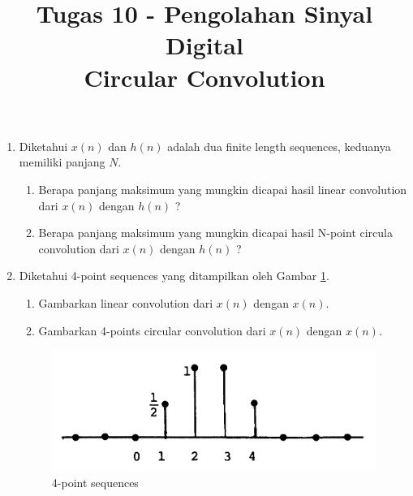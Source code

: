 \documentclass[12pt,a4paper]{article}
\title{Tugas 10 - Pengolahan Sinyal Digital\\
		Circular Convolution}
\date{}
\begin{document}
	\maketitle
	\date{}
	\begin{enumerate}
		\item Diketahui $ x(n) $ dan $ h(n) $ adalah dua finite length sequences, keduanya memiliki panjang $ N $.
		\begin{enumerate}
			\item Berapa panjang maksimum yang mungkin dicapai hasil linear convolution dari $ x(n) $ dengan $ h(n) $ ?
			\item Berapa panjang maksimum yang mungkin dicapai hasil N-point circula convolution dari $ x(n) $ dengan $ h(n) $ ?
		\end{enumerate}
		\item Diketahui 4-point sequences yang ditampilkan oleh Gambar \ref{fig:img01}.
		\begin{enumerate}
			\item Gambarkan linear convolution dari $ x(n) $ dengan $ x(n) $.
			\item Gambarkan 4-points circular convolution dari $ x(n) $ dengan $ x(n) $.
		\end{enumerate}
		\begin{figure}[H]
			\centering
			\includegraphics[width=0.7\linewidth]{img/img01}
			\caption{4-point sequences}
			\label{fig:img01}
		\end{figure}
	\end{enumerate}
\end{document}
